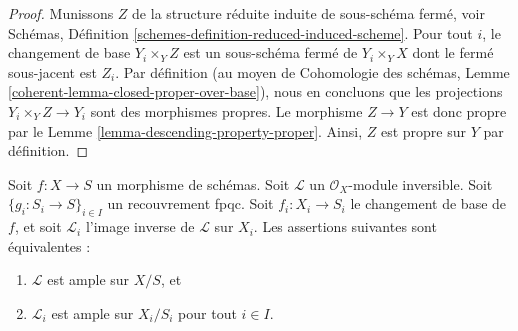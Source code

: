 \begin{proof}
Munissons $Z$ de la structure réduite induite de sous-schéma fermé, voir
Schémas, Définition \ref{schemes-definition-reduced-induced-scheme}.
Pour tout $i$, le changement de base $Y_i \times_Y Z$ est un sous-schéma
fermé de $Y_i \times_Y X$ dont le fermé sous-jacent est $Z_i$.
Par définition (au moyen de
Cohomologie des schémas,
Lemme \ref{coherent-lemma-closed-proper-over-base}),
nous en concluons que les projections $Y_i \times_Y Z \to Y_i$ sont des
morphismes propres. Le morphisme $Z \to Y$ est donc propre par le
Lemme \ref{lemma-descending-property-proper}.
Ainsi, $Z$ est propre sur $Y$ par définition.
\end{proof}

\begin{lemma}
\label{lemma-descending-property-ample}
Soit $f : X \to S$ un morphisme de schémas.
Soit $\mathcal{L}$ un $\mathcal{O}_X$-module inversible.
Soit $\{g_i : S_i \to S\}_{i \in I}$ un recouvrement fpqc.
Soit $f_i : X_i \to S_i$ le changement de base de $f$, et soit
$\mathcal{L}_i$ l'image inverse de $\mathcal{L}$ sur $X_i$.
Les assertions suivantes sont équivalentes :
\begin{enumerate}
\item $\mathcal{L}$ est ample sur $X/S$, et
\item $\mathcal{L}_i$ est ample sur $X_i/S_i$
pour tout $i \in I$.
\end{enumerate}
\end{lemma}

